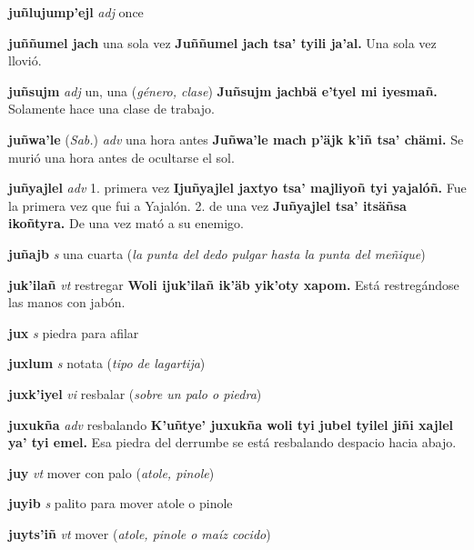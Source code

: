\documentclass[10pt]{scrbook}
\newcommand{\entry}[1]{\textbf{#1}}
\newcommand{\onedefinition}[1]{#1.}
\newcommand{\partofspeech}[1]{\textit{#1}}
\newcommand{\spanishtranslation}[1]{#1}
\newcommand{\clarification}[1]{(\textit{#1})}
\newcommand{\cholexample}[1]{\textbf{#1}}
\newcommand{\exampletranslation}[1]{#1}
\newcommand{\relevantdialect}[1]{(\textit{#1})}
\begin{document}
\begin{multicols}{2}
\entry{juñlujump'ejl}
\partofspeech{adj}
\spanishtranslation{once}

\entry{juññumel jach}
\spanishtranslation{una sola vez}
\cholexample{Juññumel jach tsa' tyili ja'al.}
\exampletranslation{Una sola vez llovió.}

\entry{juñsujm}
\partofspeech{adj}
\spanishtranslation{un, una}
\clarification{género, clase}
\cholexample{Juñsujm jachbä e'tyel mi iyesmañ.}
\exampletranslation{Solamente hace una clase de trabajo.}

\entry{juñwa'le}
\relevantdialect{Sab.}
\partofspeech{adv}
\spanishtranslation{una hora antes}
\cholexample{Juñwa'le mach p'äjk k'iñ tsa' chämi.}
\exampletranslation{Se murió una hora antes de ocultarse el sol.}

\entry{juñyajlel}
\partofspeech{adv}
\onedefinition{1}
\spanishtranslation{primera vez}
\cholexample{Ijuñyajlel jaxtyo tsa' majliyoñ tyi yajalóñ.}
\exampletranslation{Fue la primera vez que fui a Yajalón.}
\onedefinition{2}
\spanishtranslation{de una vez}
\cholexample{Juñyajlel tsa' itsäñsa ikoñtyra.}
\exampletranslation{De una vez mató a su enemigo.}

\entry{juñajb}
\partofspeech{s}
\spanishtranslation{una cuarta}
\clarification{la punta del dedo pulgar hasta la punta del meñique}

\entry{juk'ilañ}
\partofspeech{vt}
\spanishtranslation{restregar}
\cholexample{Woli ijuk'ilañ ik'äb yik'oty xapom.}
\exampletranslation{Está restregándose las manos con jabón.}

\entry{jux}
\partofspeech{s}
\spanishtranslation{piedra para afilar}

\entry{juxlum}
\partofspeech{s}
\spanishtranslation{notata}
\clarification{tipo de lagartija}

\entry{juxk'iyel}
\partofspeech{vi}
\spanishtranslation{resbalar}
\clarification{sobre un palo o piedra}

\entry{juxukña}
\partofspeech{adv}
\spanishtranslation{resbalando}
\cholexample{K'uñtye' juxukña woli tyi jubel tyilel jiñi xajlel ya' tyi emel.}
\exampletranslation{Esa piedra del derrumbe se está resbalando despacio hacia abajo.}

\entry{juy}
\partofspeech{vt}
\spanishtranslation{mover con palo}
\clarification{atole, pinole}

\entry{juyib}
\partofspeech{s}
\spanishtranslation{palito para mover atole o pinole}

\entry{juyts'iñ}
\partofspeech{vt}
\spanishtranslation{mover}
\clarification{atole, pinole o maíz cocido}


\end{multicols}
\end{document}
